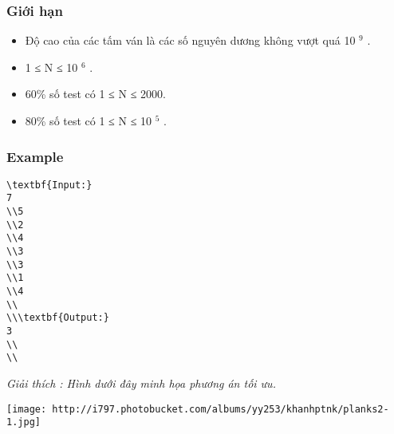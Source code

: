 \subsubsection{   Giới hạn  }
\begin{itemize}
	\item     Độ cao của các tấm ván là các số nguyên dương không vượt quá 10    $^     9    $    .   
	\item     1 ≤ N ≤ 10    $^     6    $    .   
	\item     60\% số test có 1 ≤ N ≤ 2000.   
	\item     80\% số test có 1 ≤ N ≤ 10    $^     5    $    .   
\end{itemize}

\subsubsection{   Example  }
\begin{verbatim}
\textbf{Input:}
7
\\5
\\2
\\4
\\3
\\3
\\1
\\4
\\
\\\textbf{Output:}
3
\\
\\\end{verbatim}

\emph{     Giải thích        : Hình dưới đây minh họa phương án tối ưu.   }


\texttt{[image: http://i797.photobucket.com/albums/yy253/khanhptnk/planks2-1.jpg]}